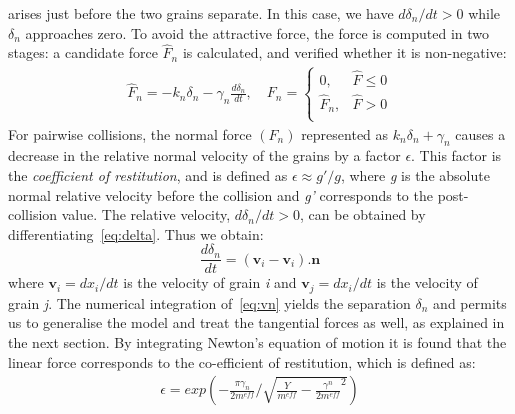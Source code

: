 arises just before 
the 
two grains separate. In this case, we have ${d{\delta_{n}}}$$/{dt} > 0$  
while $\delta_{n}$ 
approaches zero. To avoid the attractive force, the force is computed in two 
stages: a candidate 
force $\hat{F}_{n}$ is calculated, and verified whether it is non-negative:
\begin{align}
 {\hat{F}_{n}}=-{{k}_{n}}{{\delta}_{n}}-{{\gamma}_{n}}\frac{d{{\delta}_{n}}}{dt},
  \quad F_{n}=
\begin{cases}
0, & {\hat{F}} \le 0 \\
{\hat{F}}_{n}, & {\hat{F}} > 0 \\
\end{cases} \label{eq:nf}
\end{align} 
For pairwise collisions, the normal force $(F_{n})$ represented as 
${{k}_{n}}{{\delta}_{n}}+{{\gamma}_{n}}$ causes a decrease in the relative 
normal velocity of the 
grains by a factor $\epsilon$. This factor is the \textit{coefficient of 
restitution}, and is 
defined as $\epsilon\approx g'/g$, where \textit{g} is the absolute normal 
relative velocity 
before 
the collision and \textit{g'} corresponds to the post-collision value. The 
relative velocity, 
${d{\delta_{n}}}$$/{dt} > 0$, can be obtained by 
differentiating~\cref{eq:delta}. Thus we obtain:
\begin{equation}
\label{eq:vn}
\frac{d{\delta_{n}}}{dt}=(\mathbf{v}_{\mathit{i}}-\mathbf{v}_{\mathit{i}}).{\mathbf{n}}
\end{equation}
where $\mathbf{v}_{\mathit{i}}=dx_{\mathit{i}}/dt$ is the velocity of grain 
\textit{i} and 
$\mathbf{v}_{\mathit{j}}=dx_{\mathit{i}}/dt$ is the velocity of grain 
\textit{j}. The numerical 
integration of~\cref{eq:vn} yields the separation $\delta_{n}$ and permits us 
to generalise the 
model and treat the tangential forces as well, as explained in the next 
section. By integrating 
Newton's equation of motion it is found that the linear force corresponds to 
the co-efficient of 
restitution, which is defined as:
\begin{align}
\epsilon=exp(-\frac{\pi\gamma_{n}}{2m^{eff}}/\sqrt{\frac{Y}{m^{eff}}-{\frac{\gamma^{n}}{2m^{eff}}}^{2}})
\end{align}
% 


